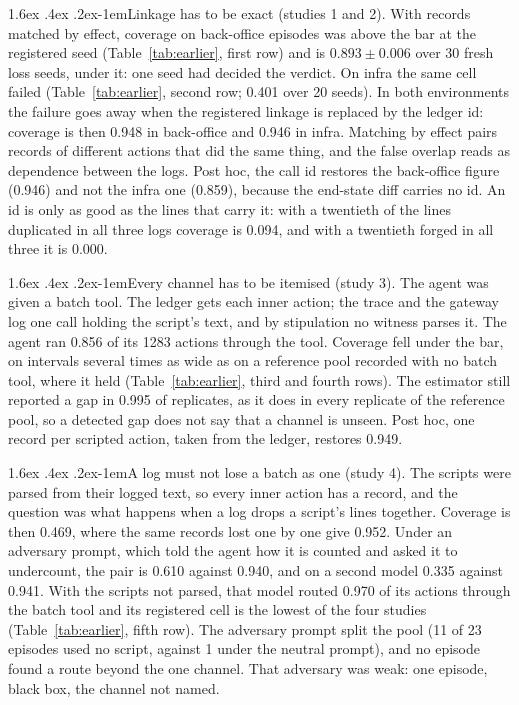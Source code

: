 \documentclass[11pt]{article}
\makeatletter
\renewcommand\paragraph{\@startsection{paragraph}{4}{\z@}%
  {1.6ex \@plus .4ex \@minus .2ex}{-1em}{\normalfont\normalsize\bfseries}}
\makeatother
\begin{document}
\paragraph{Linkage has to be exact (studies 1 and 2).} With records matched by effect,
coverage on back-office episodes was above the bar at the registered seed
(Table~\ref{tab:earlier}, first row) and is $0.893 \pm 0.006$ over 30 fresh loss seeds,
under it: one seed had decided the verdict. On infra the same cell failed
(Table~\ref{tab:earlier}, second row; 0.401 over 20 seeds). In both environments the
failure goes away when the registered linkage is replaced by the ledger id: coverage is
then 0.948 in back-office and 0.946 in infra. Matching by effect pairs records of
different actions that did the same thing, and the false overlap reads as dependence
between the logs. Post hoc, the call id restores the
back-office figure (0.946) and not the infra one (0.859), because the end-state diff
carries no id. An id is only as good as the lines that carry it: with a twentieth of the
lines duplicated in all three logs coverage is 0.094, and with a twentieth forged in all
three it is 0.000.

\paragraph{Every channel has to be itemised (study 3).} The agent was
given a batch tool. The ledger gets each inner action; the trace and the gateway log one
call holding the script's text, and by stipulation no witness parses it. The agent ran
0.856 of its 1283 actions through the tool. Coverage
fell under the bar, on intervals several times as wide as on a reference pool recorded
with no batch tool, where it held (Table~\ref{tab:earlier}, third and fourth rows). The
estimator still reported a gap in 0.995 of replicates, as it does in every replicate of
the reference pool, so a detected gap does not say that a channel is unseen. Post hoc,
one record per scripted action, taken from the ledger, restores 0.949.

\paragraph{A log must not lose a batch as one (study 4).} The scripts were parsed from
their logged text, so every inner action has a record, and the question was what happens
when a log drops a script's lines together. Coverage is then 0.469, where the same
records lost one by one give 0.952. Under an adversary prompt, which told the agent how
it is counted and asked it to undercount, the pair is 0.610 against 0.940, and on a
second model 0.335 against 0.941. With the scripts not parsed, that model routed 0.970 of
its actions through the batch tool and its registered cell is the lowest of the four
studies (Table~\ref{tab:earlier}, fifth row). The adversary prompt split the pool (11 of
23 episodes used no script, against 1 under the neutral prompt), and no episode found a
route beyond the one channel. That adversary was weak: one episode, black box, the
channel not named.
\end{document}
